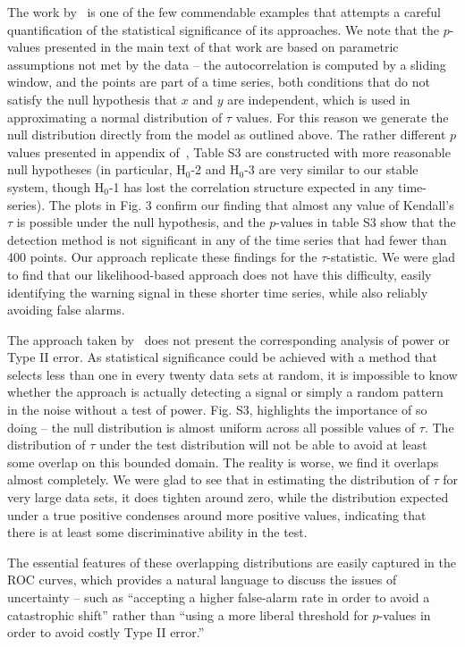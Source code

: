 \documentclass[authoryear, preprint,review,12pt]{elsarticle}
\begin{document}
The work by~\citet{Dakos2008} is one of the few commendable examples that attempts a careful quantification of the statistical significance of its approaches.  We note that the $p$-values presented in the main text of that work are based on parametric assumptions not met by the data -- the autocorrelation is computed by a sliding window, and the points are part of a time series, both conditions that do not satisfy the null hypothesis that $x$ and $y$ are independent, which is used in approximating a normal distribution of $\tau$ values.  For this reason we generate the null distribution directly from the model as outlined above.   The rather different $p$ values presented in appendix of~\citet{Dakos2008}, Table S3 are constructed with more reasonable null hypotheses (in particular, H$_0$-2 and H$_0$-3 are very similar to our stable system, though H$_0$-1 has lost the correlation structure expected in any time-series).  The plots in Fig. 3 confirm our finding that almost any value of Kendall's $\tau$ is possible under the null hypothesis, and the $p$-values in table S3 show that the detection method is not significant in any of the time series that had fewer than 400 points.  Our approach replicate these findings for the $\tau$-statistic.  We were glad to find that our likelihood-based approach does not have this difficulty, easily identifying the warning signal in these shorter time series, while also reliably avoiding false alarms.  

The approach taken by~\citet{Dakos2008} does not present the corresponding analysis of power or Type II error.  As statistical significance could be achieved with a method that selects less than one in every twenty data sets at random, it is impossible to know whether the approach is actually detecting a signal or simply a random pattern in the noise without a test of power.  Fig. S3, highlights the importance of so doing -- the null distribution is almost uniform across all possible values of $\tau$.  The distribution of $\tau$ under the test distribution will not be able to avoid at least some overlap on this bounded domain.  The reality is worse, we find it overlaps almost completely.  We were glad to see that in estimating the distribution of $\tau$ for very large data sets, it does tighten around zero, while the distribution expected under a true positive condenses around more positive values, indicating that there is at least some discriminative ability in the test. 

The essential features of these overlapping distributions are easily captured in the ROC curves, which provides a natural language to discuss the issues of uncertainty -- such as ``accepting a higher false-alarm rate in order to avoid a catastrophic shift'' rather than ``using a more liberal threshold for $p$-values in order to avoid costly Type II error.''  
\end{document}
